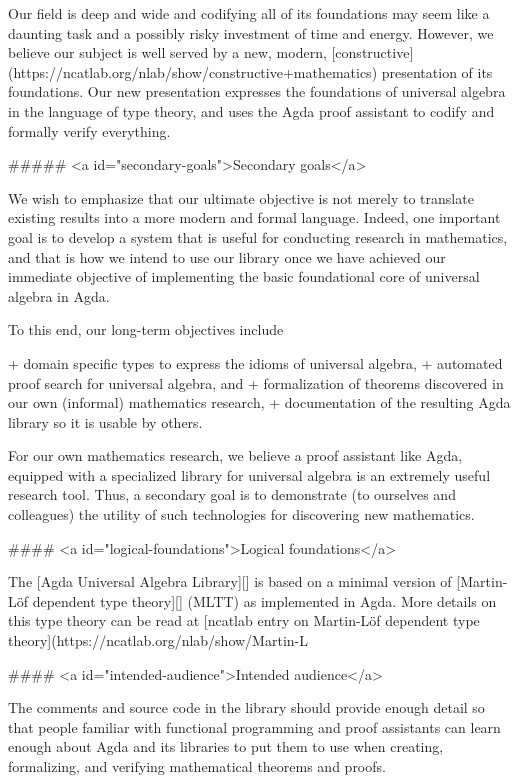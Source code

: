 Our field is deep and wide and codifying all of its foundations may seem like a
daunting task and a possibly risky investment of time and energy.  However, we
believe our subject is well served by a new, modern,
[constructive](https://ncatlab.org/nlab/show/constructive+mathematics)
presentation of its foundations.  Our new presentation expresses the foundations
of universal algebra in the language of type theory, and uses the Agda proof
assistant to codify and formally verify everything.

##### <a id="secondary-goals">Secondary goals</a>

We wish to emphasize that our ultimate objective is not merely to translate
existing results into a more modern and formal language.  Indeed, one important
goal is to develop a system that is useful for conducting research in mathematics,
and that is how we intend to use our library once we have achieved our immediate
objective of implementing the basic foundational core of universal algebra in
Agda.

To this end, our long-term objectives include

+ domain specific types to express the idioms of universal algebra,
+ automated proof search for universal algebra, and
+ formalization of theorems discovered in our own (informal) mathematics research,
+ documentation of the resulting Agda library so it is usable by others.

For our own mathematics research, we believe a proof assistant like Agda, equipped
with a specialized library for universal algebra is an extremely useful research
tool. Thus, a secondary goal is to demonstrate (to ourselves and colleagues) the
utility of such technologies for discovering new mathematics.

#### <a id="logical-foundations">Logical foundations</a>

The [Agda Universal Algebra Library][] is based on a minimal version of
[Martin-Löf dependent type theory][] (MLTT) as implemented in Agda. More details
on this type theory can be read at [ncatlab entry on Martin-Löf dependent type
theory](https://ncatlab.org/nlab/show/Martin-L%


#### <a id="intended-audience">Intended audience</a>

The comments and source code in the library should provide enough detail so that
people familiar with functional programming and proof assistants can learn enough
about Agda and its libraries to put them to use when creating, formalizing, and
verifying mathematical theorems and proofs.

